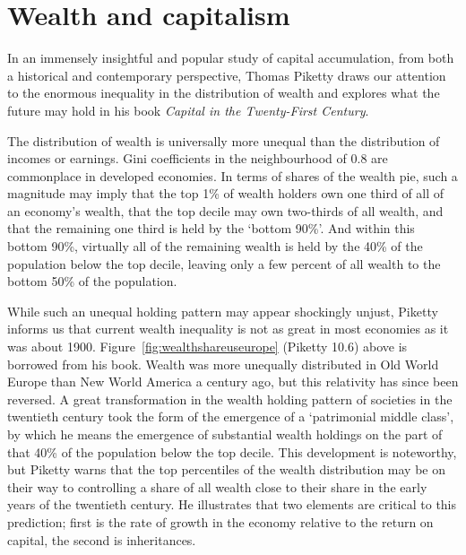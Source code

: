 \section{Wealth and capitalism}\label{sec:ch13sec8}

In an immensely insightful and popular study of capital accumulation, from both a historical and contemporary perspective, Thomas Piketty draws our attention to the enormous inequality in the distribution of wealth and explores what the future may hold in his book \textit{Capital in the Twenty-First Century}.

The distribution of wealth is universally more unequal than the distribution of incomes or earnings. Gini coefficients in the neighbourhood of 0.8 are commonplace in developed economies. In terms of shares of the wealth pie, such a magnitude may imply that the top 1\% of wealth holders own one third of all of an economy's wealth, that the top decile may own two-thirds of all wealth, and that the remaining one third is held by the `bottom 90\%'. And within this bottom 90\%, virtually all of the remaining wealth is held by the 40\% of the population below the top decile, leaving only a few percent of all wealth to the bottom 50\% of the population.



While such an unequal holding pattern may appear shockingly unjust, Piketty informs us that current wealth inequality is not as great in most economies as it was about 1900. Figure~\ref{fig:wealthshareuseurope} (Piketty 10.6) above is borrowed from his book. Wealth was more unequally distributed in Old World Europe than New World America a century ago, but this relativity has since been reversed. A great transformation in the wealth holding pattern of societies in the twentieth century took the form of the emergence of a `patrimonial middle class', by which he means the emergence of substantial wealth holdings on the part of that 40\% of the population below the top decile. This development is noteworthy, but Piketty warns that the top percentiles of the wealth distribution may be on their way to controlling a share of all wealth close to their share in the early years of the twentieth century. He illustrates that two elements are critical to this prediction; first is the rate of growth in the economy relative to the return on capital, the second is inheritances.

